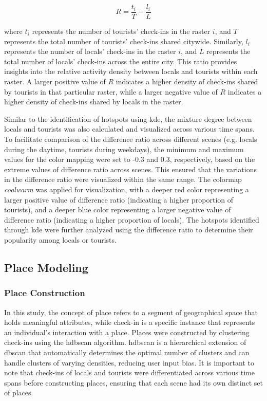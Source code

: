 \documentclass{article}
\theoremstyle{definition}
\theoremstyle{remark}
\begin{document}
\begin{equation} \label{eq:diff_ratio}
    R = \frac{t_{i}}{T}-\frac{l_{i}}{L}
\end{equation}

where $t_{i}$ represents the number of tourists' check-ins in the raster $i$, and $T$ represents the total number of tourists' check-ins shared citywide. Similarly, $l_{i}$ represents the number of locals' check-ins in the raster $i$, and $L$ represents the total number of locals' check-ins across the entire city. This ratio provides insights into the relative activity density between locals and tourists within each raster. A larger positive value of $R$ indicates a higher density of check-ins shared by tourists in that particular raster, while a larger negative value of \(R\) indicates a higher density of check-ins shared by locals in the raster.

Similar to the identification of hotspots using \acrshort{kde}, the mixture degree between locals and tourists was also calculated and visualized across various time spans. To facilitate comparison of the difference ratio across different scenes (e.g. locals during the daytime, tourists during weekdays), the minimum and maximum values for the color mapping were set to -0.3 and 0.3, respectively, based on the extreme values of difference ratio across scenes. This ensured that the variations in the difference ratio were visualized within the same range. The colormap \textit{coolwarm} was applied for visualization, with a deeper red color representing a larger positive value of difference ratio (indicating a higher proportion of tourists), and a deeper blue color representing a larger negative value of difference ratio (indicating a higher proportion of locals). The hotspots identified through \acrshort{kde} were further analyzed using the difference ratio to determine their popularity among locals or tourists.


\subsection{Place Modeling} \label{place_modeling}

\subsubsection{Place Construction} \label{place_construction}
In this study, the concept of place refers to a segment of geographical space that holds meaningful attributes, while check-in is a specific instance that represents an individual's interaction with a place. Places were constructed by clustering check-ins using the \acrfull{hdbscan} \citep{campello_density-based_2013} algorithm. \acrshort{hdbscan} is a hierarchical extension of \acrshort{dbscan} that automatically determines the optimal number of clusters and can handle clusters of varying densities, reducing user input bias. It is important to note that check-ins of locals and tourists were differentiated across various time spans before constructing places, ensuring that each scene had its own distinct set of places.
\end{document}
